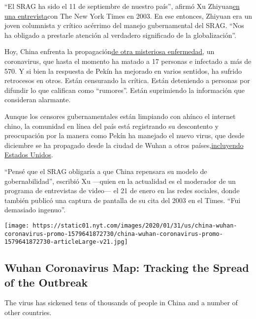``El SRAG ha sido el 11 de septiembre de nuestro país'', afirmó Xu
Zhiyuan\href{https://www.nytimes.com/2003/05/13/world/rude-awakening.html}{en
una entrevista}con The New York Times en 2003. En ese entonces, Zhiyuan
era un joven columnista y crítico acérrimo del manejo gubernamental del
SRAG. ``Nos ha obligado a prestarle atención al verdadero significado de
la globalización''.

Hoy, China enfrenta la
propagación\href{https://www.nytimes.com/2020/01/21/world/asia/china-coronavirus-wuhan.html?action=click\&module=Top\%20Stories\&pgtype=Homepage}{de
otra misteriosa enfermedad}, un coronavirus, que hasta el momento ha
matado a 17 personas e infectado a más de 570. Y si bien la respuesta de
Pekín ha mejorado en varios sentidos, ha sufrido retrocesos en otros.
Están censurando la crítica. Están deteniendo a personas por difundir lo
que califican como ``rumores''. Están suprimiendo la información que
consideran alarmante.

Aunque los censores gubernamentales están limpiando con ahínco el
internet chino, la comunidad en línea del país está registrando su
descontento y preocupación por la manera como Pekín ha manejado el nuevo
virus, que desde diciembre se ha propagado desde la ciudad de Wuhan a
otros
países,\href{https://www.nytimes.com/2020/01/21/health/cdc-coronavirus.html}{incluyendo
Estados Unidos}.

``Pensé que el SRAG obligaría a que China repensara su modelo de
gobernabilidad'', escribió Xu ---quien en la actualidad es el moderador
de un programa de entrevistas de video--- el 21 de enero en las redes
sociales, donde también publicó una captura de pantalla de su cita del
2003 en el Times. ``Fui demasiado ingenuo''.

\href{https://www.nytimes.com/interactive/2020/01/21/world/asia/china-coronavirus-maps.html}{}

\texttt{[image: https://static01.nyt.com/images/2020/01/31/us/china-wuhan-coronavirus-promo-1579641872730/china-wuhan-coronavirus-promo-1579641872730-articleLarge-v21.jpg]}

\hypertarget{wuhan-coronavirus-map-tracking-the-spread-of-the-outbreak}{%
\subsection{Wuhan Coronavirus Map: Tracking the Spread of the
Outbreak}\label{wuhan-coronavirus-map-tracking-the-spread-of-the-outbreak}}

The virus has sickened tens of thousands of people in China and a number
of other countries.

